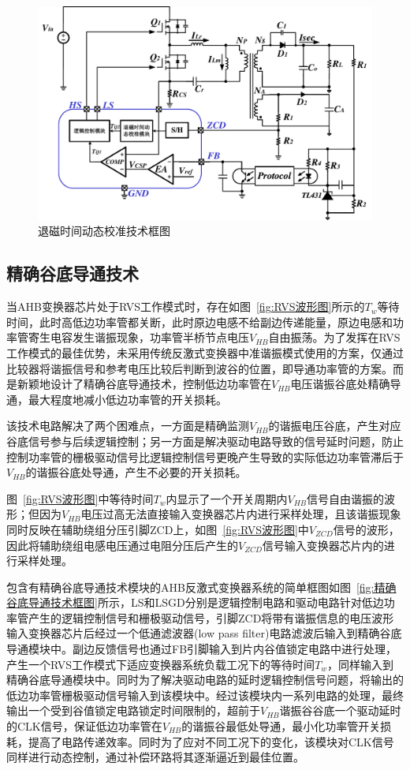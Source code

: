 \begin{figure}[htbp] 
    \centering
    \includegraphics[width=0.8\linewidth]{figures/退磁时间动态校准图.pdf}
    \caption{退磁时间动态校准技术框图}
    \label{fig:退磁时间1}
\end{figure}


\subsection{精确谷底导通技术}
当AHB变换器芯片处于RVS工作模式时，存在如图~\ref{fig:RVS波形图}所示的$T_w$等待时间，此时高低边功率管都关断，此时原边电感不给副边传递能量，原边电感和功率管寄生电容发生谐振现象，功率管半桥节点电压$V_{HB}$自由振荡。为了发挥在RVS工作模式的最佳优势，未采用传统反激式变换器中准谐振模式使用的方案，仅通过比较器将谐振信号和参考电压比较后判断到波谷的位置，即导通功率管的方案。而是新颖地设计了精确谷底导通技术，控制低边功率管在$V_{HB}$电压谐振谷底处精确导通，最大程度地减小低边功率管的开关损耗。

该技术电路解决了两个困难点，一方面是精确监测$V_{HB}$的谐振电压谷底，产生对应谷底信号参与后续逻辑控制；另一方面是解决驱动电路导致的信号延时问题，防止控制功率管的栅极驱动信号比逻辑控制信号更晚产生导致的实际低边功率管滞后于$V_{HB}$的谐振谷底处导通，产生不必要的开关损耗。

图~\ref{fig:RVS波形图}中等待时间$T_w$内显示了一个开关周期内$V_{HB}$信号自由谐振的波形；但因为$V_{HB}$电压过高无法直接输入变换器芯片内进行采样处理，且该谐振现象同时反映在辅助绕组分压引脚ZCD上，如图~\ref{fig:RVS波形图}中$V_{ZCD}$信号的波形，因此将辅助绕组电感电压通过电阻分压后产生的$V_{ZCD}$信号输入变换器芯片内的进行采样处理。

包含有精确谷底导通技术模块的AHB反激式变换器系统的简单框图如图~\ref{fig:精确谷底导通技术框图}所示，LS和LSGD分别是逻辑控制电路和驱动电路针对低边功率管产生的逻辑控制信号和栅极驱动信号，引脚ZCD将带有谐振信息的电压波形输入变换器芯片后经过一个低通滤波器(low pass filter)电路滤波后输入到精确谷底导通模块中。副边反馈信号也通过FB引脚输入到片内谷值锁定电路中进行处理，产生一个RVS工作模式下适应变换器系统负载工况下的等待时间$T_w$，同样输入到精确谷底导通模块中。同时为了解决驱动电路的延时逻辑控制信号问题，将输出的低边功率管栅极驱动信号输入到该模块中。经过该模块内一系列电路的处理，最终输出一个受到谷值锁定电路锁定时间限制的，超前于$V_{HB}$谐振谷谷底一个驱动延时的CLK信号，保证低边功率管在$V_{HB}$的谐振谷最低处导通，最小化功率管开关损耗，提高了电路传递效率。同时为了应对不同工况下的变化，该模块对CLK信号同样进行动态控制，通过补偿环路将其逐渐逼近到最佳位置。



